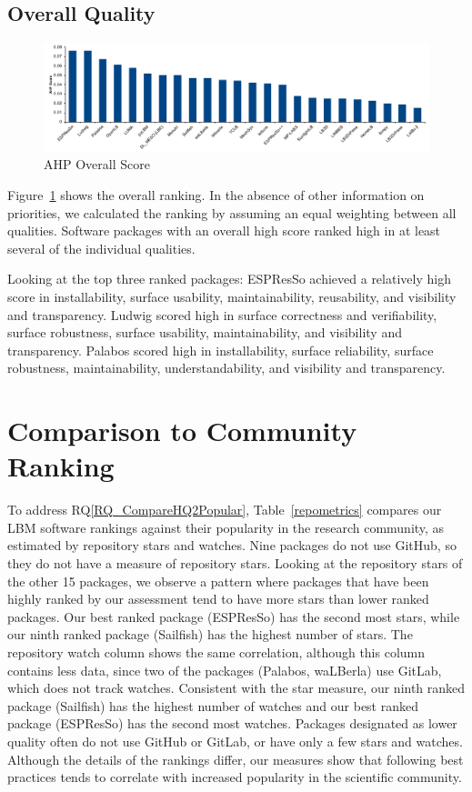\documentclass[final, 3p, times, authoryear]{elsarticle}
\newcommand{\rqref}[1]{RQ\ref{#1}}
\begin{document}
\subsection{Overall Quality} \label{Sec_OverallQuality}

\begin{figure}[h!]
	\centering
		\includegraphics[width=1.0\textwidth]{./figures/finalscore_chart.pdf}
		\caption{AHP Overall Score}
		\label{Fig_OverallScore}
\end{figure}

Figure~\ref{Fig_OverallScore} shows the overall ranking. In the absence of other
information on priorities, we calculated the ranking by assuming an equal
weighting between all qualities. Software packages with an overall high score
ranked high in at least several of the individual qualities. 

Looking at the top three ranked packages: ESPResSo achieved a relatively high
score in installability, surface usability, maintainability, reusability, and
visibility and transparency. Ludwig scored high in surface correctness and
verifiability, surface robustness, surface usability, maintainability, and
visibility and transparency. Palabos scored high in installability, surface
reliability, surface robustness, maintainability, understandability, and
visibility and transparency.

\section{Comparison to Community Ranking} \label{repmetrics}

To address \rqref{RQ_CompareHQ2Popular}, Table~\ref{repometrics} compares our
LBM software rankings against their popularity in the research community, as
estimated by repository stars and watches. Nine packages do not use GitHub, so
they do not have a measure of repository stars. Looking at the repository stars
of the other 15 packages, we observe a pattern where packages that have been
highly ranked by our assessment tend to have more stars than lower ranked
packages. Our best ranked package (ESPResSo) has the second most stars, while
our ninth ranked package (Sailfish) has the highest number of stars. The
repository watch column shows the same correlation, although this column
contains less data, since two of the packages (Palabos, waLBerla) use GitLab,
which does not track watches. Consistent with the star measure, our ninth ranked
package (Sailfish) has the highest number of watches and our best ranked package
(ESPResSo) has the second most watches. Packages designated as lower quality
often do not use GitHub or GitLab, or have only a few stars and watches.
Although the details of the rankings differ, our measures show that following
best practices tends to correlate with increased popularity in the scientific
community.
\end{document}
